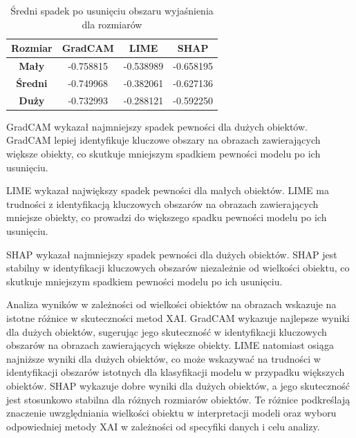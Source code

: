 \begin{table}[h]
	\centering
	\begin{tabular}{|c|c|c|c|}
		\hline
		\textbf{Rozmiar} & \textbf{GradCAM} & \textbf{LIME} & \textbf{SHAP} \\
		\hline
		\textbf{Mały}    & -0.758815        & -0.538989     & -0.658195     \\
		\hline
		\textbf{Średni}  & -0.749968        & -0.382061     & -0.627136     \\
		\hline
		\textbf{Duży}    & -0.732993        & -0.288121     & -0.592250     \\
		\hline
	\end{tabular}
	\caption{Średni spadek po usunięciu obszaru wyjaśnienia dla rozmiarów}
	\label{tab:size_confidence_no_exp}
\end{table}

GradCAM wykazał najmniejszy spadek pewności dla dużych obiektów.
GradCAM lepiej identyfikuje kluczowe obszary na obrazach zawierających większe obiekty, co skutkuje mniejszym spadkiem pewności modelu po ich usunięciu.

LIME wykazał największy spadek pewności dla małych obiektów.
LIME ma trudności z identyfikacją kluczowych obszarów na obrazach zawierających mniejsze obiekty, co prowadzi do większego spadku pewności modelu po ich usunięciu.

SHAP wykazał najmniejszy spadek pewności dla dużych obiektów.
SHAP jest stabilny w identyfikacji kluczowych obszarów niezależnie od wielkości obiektu, co skutkuje mniejszym spadkiem pewności modelu po ich usunięciu.

\vspace{1cm}
Analiza wyników w zależności od wielkości obiektów na obrazach wskazuje na istotne różnice w skuteczności metod XAI.
GradCAM wykazuje najlepsze wyniki dla dużych obiektów, sugerując jego skuteczność w identyfikacji kluczowych obszarów na obrazach zawierających większe obiekty.
LIME natomiast osiąga najniższe wyniki dla dużych obiektów, co może wskazywać na trudności w identyfikacji obszarów istotnych dla klasyfikacji modelu w przypadku większych obiektów.
SHAP wykazuje dobre wyniki dla dużych obiektów, a jego skuteczność jest stosunkowo stabilna dla różnych rozmiarów obiektów.
Te różnice podkreślają znaczenie uwzględniania wielkości obiektu w interpretacji modeli oraz wyboru odpowiedniej metody XAI w zależności od specyfiki danych i celu analizy.

